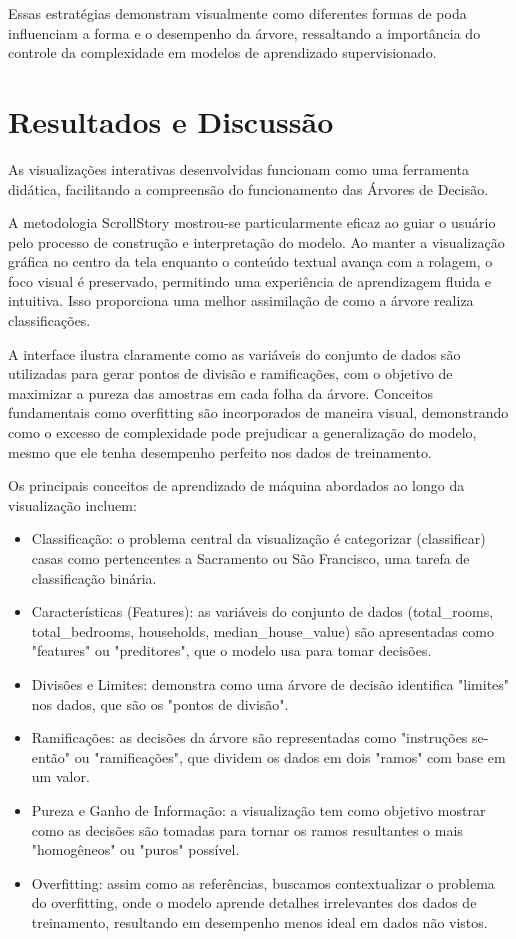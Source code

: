 \documentclass[conference]{IEEEtran}
\begin{document}
Essas estratégias demonstram visualmente como diferentes formas de poda influenciam a forma e o desempenho da árvore, ressaltando a importância do controle da complexidade em modelos de aprendizado supervisionado.

\section{Resultados e Discussão}
As visualizações interativas desenvolvidas funcionam como uma ferramenta didática, facilitando a compreensão do funcionamento das Árvores de Decisão.

A metodologia ScrollStory mostrou-se particularmente eficaz ao guiar o usuário pelo processo de construção e interpretação do modelo. Ao manter a visualização gráfica no centro da tela enquanto o conteúdo textual avança com a rolagem, o foco visual é preservado, permitindo uma experiência de aprendizagem fluida e intuitiva. Isso proporciona uma melhor assimilação de como a árvore realiza classificações.

A interface ilustra claramente como as variáveis do conjunto de dados são utilizadas para gerar pontos de divisão e ramificações, com o objetivo de maximizar a pureza das amostras em cada folha da árvore. Conceitos fundamentais como overfitting são incorporados de maneira visual, demonstrando como o excesso de complexidade pode prejudicar a generalização do modelo, mesmo que ele tenha desempenho perfeito nos dados de treinamento.

Os principais conceitos de aprendizado de máquina abordados ao longo da visualização incluem:

\begin{itemize}
    \item Classificação: o problema central da visualização é categorizar (classificar) casas como pertencentes a 
    Sacramento ou São Francisco, uma tarefa de classificação binária.
    \item Características (Features): as variáveis do conjunto de dados (total\_rooms, total\_bedrooms, households, median\_house\_value)
    são apresentadas como "features" ou "preditores", que o modelo usa para tomar decisões.
    \item Divisões e Limites: demonstra como uma árvore de decisão identifica "limites" 
    nos dados, que são os "pontos de divisão".
    \item Ramificações: as decisões da árvore são representadas como "instruções se-então" ou "ramificações", que dividem os dados em dois "ramos" com base em um valor.
    \item Pureza e Ganho de Informação: a visualização tem como objetivo mostrar como as 
    decisões são tomadas para tornar os ramos resultantes o mais "homogêneos" ou "puros" possível. 
    \item Overfitting: assim como as referências, buscamos contextualizar o problema do overfitting, 
    onde o modelo aprende detalhes irrelevantes dos dados de treinamento, resultando em desempenho menos ideal em dados não vistos.
\end{itemize}
\end{document}
